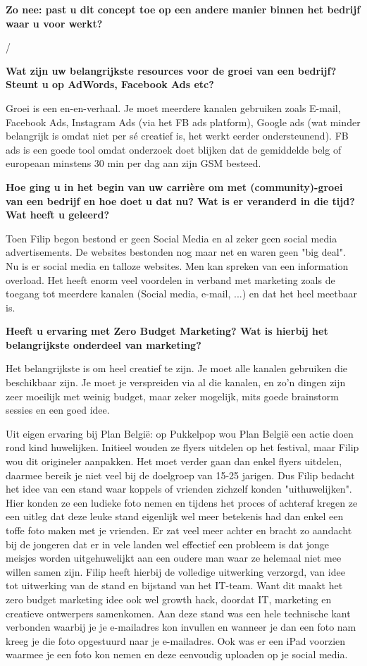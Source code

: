 \textbf{Zo nee: past u dit concept toe op een andere manier binnen het bedrijf waar u voor werkt?}
	
/

\textbf{Wat zijn uw belangrijkste resources voor de groei van een bedrijf? Steunt u op AdWords, Facebook Ads etc?}
	
Groei is een en-en-verhaal. Je moet meerdere kanalen gebruiken zoals E-mail, Facebook Ads, Instagram Ads (via het FB ads platform), Google ads (wat minder belangrijk is omdat niet per sé creatief is, het werkt eerder ondersteunend). FB ads is een goede tool omdat onderzoek doet blijken dat de gemiddelde belg of europeaan minstens 30 min per dag aan zijn GSM besteed.

	
\textbf{Hoe ging u in het begin van uw carrière om met (community)-groei van een bedrijf en hoe doet u dat nu? Wat is er veranderd in die tijd? Wat heeft u geleerd?}
	
Toen Filip begon bestond er geen Social Media en al zeker geen social media advertisements. De websites bestonden nog maar net en waren geen "big deal". 
Nu is er social media en talloze websites. Men kan spreken van een information overload. Het heeft enorm veel voordelen in verband met marketing zoals de toegang tot meerdere kanalen (Social media, e-mail, ...) en dat het heel meetbaar is.
		
\textbf{Heeft u ervaring met Zero Budget Marketing? Wat is hierbij het belangrijkste onderdeel van marketing?}
	
	Het belangrijkste is om heel creatief te zijn. Je moet alle kanalen gebruiken die beschikbaar zijn. Je moet je verspreiden via al die kanalen, en zo'n dingen zijn zeer moeilijk met weinig budget, maar zeker mogelijk, mits goede brainstorm sessies en een goed idee. 
	
	Uit eigen ervaring bij Plan België: op Pukkelpop wou Plan België een actie doen rond kind huwelijken. Initieel wouden ze flyers uitdelen op het festival, maar Filip wou dit origineler aanpakken. Het moet verder gaan dan enkel flyers uitdelen, daarmee bereik je niet veel bij de doelgroep van 15-25 jarigen. Dus Filip bedacht het idee van een stand waar koppels of vrienden zichzelf konden "uithuwelijken". Hier konden ze een ludieke foto nemen en tijdens het proces of achteraf kregen ze een uitleg dat deze leuke stand eigenlijk wel meer betekenis had dan enkel een toffe foto maken met je vrienden. Er zat veel meer achter en bracht zo aandacht bij de jongeren dat er in vele landen wel effectief een probleem is dat jonge meisjes worden uitgehuwelijkt aan een oudere man waar ze helemaal niet mee willen samen zijn. Filip heeft hierbij de volledige uitwerking verzorgd, van idee tot uitwerking van de stand en bijstand van het IT-team. Want dit maakt het zero budget marketing idee ook wel growth hack, doordat IT, marketing en creatieve ontwerpers samenkomen. Aan deze stand was een hele technische kant verbonden waarbij je je e-mailadres kon invullen en wanneer je dan een foto nam kreeg je die foto opgestuurd naar je e-mailadres. Ook was er een iPad voorzien waarmee je een foto kon nemen en deze eenvoudig uploaden op je social media.
	
